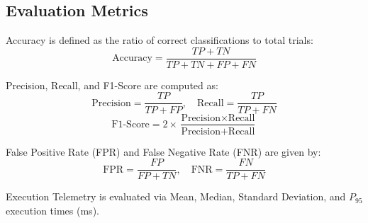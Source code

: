 \documentclass[conference]{IEEEtran}
\begin{document}
\begin{table}[t]
\caption{Experimental Configuration Matrix}
\label{tab:config}
\centering
{}
\end{table}

\subsection{Evaluation Metrics}
Accuracy is defined as the ratio of correct classifications to total trials:
\begin{equation}
\text{Accuracy} = \frac{TP + TN}{TP + TN + FP + FN}
\end{equation}

Precision, Recall, and F1-Score are computed as:
\begin{equation}
\text{Precision} = \frac{TP}{TP + FP}, \quad \text{Recall} = \frac{TP}{TP + FN}
\end{equation}
\begin{equation}
\text{F1-Score} = 2 \times \frac{\text{Precision} \times \text{Recall}}{\text{Precision} + \text{Recall}}
\end{equation}

False Positive Rate (FPR) and False Negative Rate (FNR) are given by:
\begin{equation}
\text{FPR} = \frac{FP}{FP + TN}, \quad \text{FNR} = \frac{FN}{TP + FN}
\end{equation}

Execution Telemetry is evaluated via Mean, Median, Standard Deviation, and $P_{95}$ execution times (ms).
\end{document}

